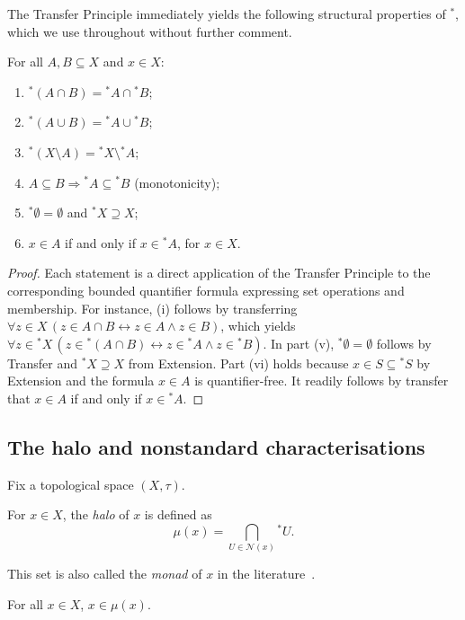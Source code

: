 \documentclass[submission,copyright,creativecommons]{eptcs}
\newcommand{\Nbd}{\mathcal{N}}
\newcommand{\str}{{{}^{*}\!}}
\begin{document}
The Transfer Principle immediately yields the following structural properties of $\str$, which we use throughout without further comment.

\begin{lemma}
\label{lem:star}
For all $A, B \subseteq X$ and $x \in X$:
\begin{enumerate}[label=\textup{(\roman*)}]
  \item $\str(A \cap B) = \str A \cap \str B$;
  \item $\str(A \cup B) = \str A \cup \str B$;
  \item $\str(X \setminus A) = \str X \setminus \str A$;
  \item $A \subseteq B \Rightarrow \str A \subseteq \str B$\quad
    \textup{(monotonicity)};
  \item $\str\emptyset = \emptyset$ and $\str X \supseteq  X$;
  \item $x \in A$ if and only if $x \in \str A$, for $x \in X$.
\end{enumerate}
\end{lemma}

\begin{proof}
Each statement is a direct application of the Transfer Principle to the corresponding bounded quantifier formula expressing set operations and membership. 
For instance, (i) follows by transferring 
$\forall z \in X\,(z \in A \cap B \leftrightarrow z \in A \wedge z \in B)$, 
which yields 
$\forall z \in \str X\,(z \in \str(A \cap B) \leftrightarrow z \in \str A \wedge z \in \str B)$.
In part (v), $\str\emptyset = \emptyset$ follows by Transfer and $\str X \supseteq X$ from Extension.
Part (vi) holds because $x \in S \subseteq \str S$ by Extension and the formula $x \in A$ is quantifier-free. 
It readily follows by transfer that $x \in A$ if and only if $x \in \str A$.
\end{proof}


\subsection{The halo and nonstandard characterisations}

Fix a topological space $(X, \tau)$. 

\begin{definition}[halo]
\label{def:halo}
For $x \in X$, the \emph{halo} of $x$ is defined as
\[
  \mu(x) = \bigcap_{U \in \Nbd(x)} \str U.
\]
\end{definition}
This set is also called the \emph{monad} of $x$ in the 
literature~\cite{Robinson1966,SalbanyTodorov1999}.
\begin{lemma}
\label{lem:halorefl}
For all $x \in X$, $x \in \mu(x)$.
\end{lemma}
\end{document}
